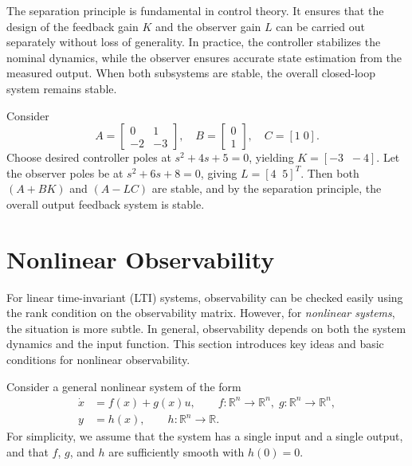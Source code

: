 \begin{remark}
The separation principle is fundamental in control theory.  
It ensures that the design of the feedback gain $K$ and the observer gain $L$
can be carried out separately without loss of generality.  
In practice, the controller stabilizes the nominal dynamics,
while the observer ensures accurate state estimation from the measured output.
When both subsystems are stable, the overall closed-loop system remains stable.
\end{remark}

\begin{example}
Consider
\[
A = \begin{bmatrix} 0 & 1 \\ -2 & -3 \end{bmatrix}, \quad
B = \begin{bmatrix} 0 \\ 1 \end{bmatrix}, \quad
C = [1 \; 0].
\]
Choose desired controller poles at $s^2 + 4s + 5 = 0$,
yielding $K = [-3 \;\; -4]$.  
Let the observer poles be at $s^2 + 6s + 8 = 0$, 
giving $L = [4 \;\; 5]^T$.  
Then both $(A + BK)$ and $(A - LC)$ are stable, 
and by the separation principle, the overall output feedback system is stable.
\end{example}


\section{Nonlinear Observability}

For linear time-invariant (LTI) systems, observability can be checked easily using the
rank condition on the observability matrix.  
However, for \emph{nonlinear systems}, the situation is more subtle.  
In general, observability depends on both the system dynamics and the input function.  
This section introduces key ideas and basic conditions for nonlinear observability.

\noindent Consider a general nonlinear system of the form
\begin{align}
    \dot{x} &= f(x) + g(x)u, \qquad f:\mathbb{R}^n \to \mathbb{R}^n, \; g:\mathbb{R}^n \to \mathbb{R}^n, \label{eq:nonlinear_system}\\
    y &= h(x), \qquad h:\mathbb{R}^n \to \mathbb{R}. \label{eq:nonlinear_output}
\end{align}
For simplicity, we assume that the system has a single input and a single output,
and that $f$, $g$, and $h$ are sufficiently smooth with $h(0) = 0$.

